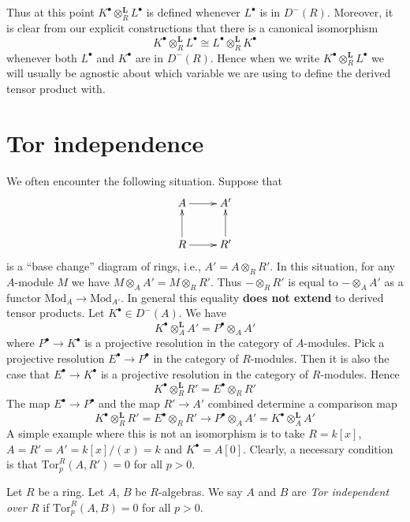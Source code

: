 \noindent
Thus at this point $K^\bullet \otimes_R^{\mathbf{L}} L^\bullet$
is defined whenever $L^\bullet$ is in $D^{-}(R)$.
Moreover, it is clear from our explicit constructions that
there is a canonical isomorphism
$$
K^\bullet \otimes_R^{\mathbf{L}} L^\bullet
\cong
L^\bullet \otimes_R^{\mathbf{L}} K^\bullet
$$
whenever both $L^\bullet$ and $K^\bullet$ are in $D^{-}(R)$.
Hence when we write $K^\bullet \otimes_R^{\mathbf{L}} L^\bullet$
we will usually be agnostic about which variable we are using to
define the derived tensor product with.

\section{Tor independence}
\label{section-tor-independece}

\noindent
We often encounter the following situation. Suppose that
$$
\xymatrix{
A \ar[r] & A' \\
R \ar[r] \ar[u] & R' \ar[u]
}
$$
is a ``base change'' diagram of rings, i.e., $A' = A \otimes_R R'$.
In this situation, for any $A$-module $M$ we have
$M \otimes_A A' = M \otimes_R R'$. Thus $- \otimes_R R'$
is equal to $- \otimes_A A'$ as a functor $\text{Mod}_A \to \text{Mod}_{A'}$.
In general this equality {\bf does not extend} to derived tensor products.
Let $K^\bullet \in D^{-}(A)$. We have
$$
K^\bullet \otimes_A^{\mathbf{L}} A' = P^\bullet \otimes_A A'
$$
where $P^\bullet \to K^\bullet$ is a projective resolution in the
category of $A$-modules. Pick a projective resolution
$E^\bullet \to P^\bullet$ in the category of $R$-modules.
Then it is also the case that $E^\bullet \to K^\bullet$ is a projective
resolution in the category of $R$-modules. Hence
$$
K^\bullet \otimes_R^{\mathbf{L}} R' = E^\bullet \otimes_R R'
$$
The map $E^\bullet \to P^\bullet$ and the map $R' \to A'$
combined determine a comparison map
\begin{equation}
\label{equation-comparison-map}
K^\bullet \otimes_R^{\mathbf{L}} R' =
E^\bullet \otimes_R R'
\longrightarrow
P^\bullet \otimes_A A' =
K^\bullet \otimes_A^{\mathbf{L}} A'
\end{equation}
A simple example where this is not an isomorphism is to take
$R = k[x]$, $A = R' = A' = k[x]/(x) = k$ and $K^\bullet = A[0]$.
Clearly, a necessary condition is that $\text{Tor}_p^R(A, R') = 0$
for all $p > 0$.

\begin{definition}
\label{definition-tor-independent}
Let $R$ be a ring. Let $A$, $B$ be $R$-algebras. We say
$A$ and $B$ are {\it Tor independent over $R$} if
$\text{Tor}_p^R(A, B) = 0$ for all $p > 0$.
\end{definition}

